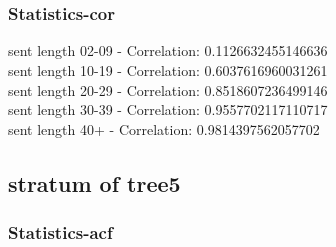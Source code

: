 \documentclass{article}%
\begin{document}
\begin{figure}[ht]%
\centering%
\setlength{\abovecaptionskip}{-35pt}%
%
%
\\%
%
%
\\%
%
\end{figure}

%
\newpage%
\subsubsection{Statistics{-}cor}%
\label{ssubsec:Statistics{-}cor}%
\noindent%
sent length 02-09 - Correlation: 0.1126632455146636\\%
sent length 10-19 - Correlation: 0.6037616960031261\\%
sent length 20-29 - Correlation: 0.8518607236499146\\%
sent length 30-39 - Correlation: 0.9557702117110717\\%
sent length 40+ - Correlation: 0.9814397562057702\\

%
\newpage

%
\subsection{stratum of tree5}%
\label{subsec:stratumoftree5}%
\subsubsection{Statistics{-}acf}%
\label{ssubsec:Statistics{-}acf}%
\end{document}
